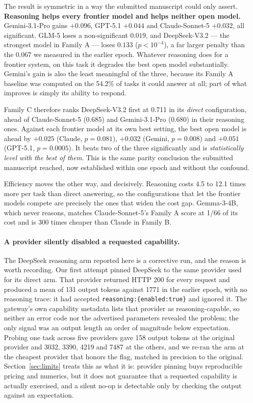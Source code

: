 \documentclass[computers,article,submit,moreauthors]{Definitions/mdpi}
\begin{document}
The result is symmetric in a way the submitted manuscript could only assert. \textbf{Reasoning helps every frontier model and helps neither open model.} Gemini-3.1-Pro gains $+0.096$, GPT-5.1 $+0.044$ and Claude-Sonnet-5 $+0.032$, all significant. GLM-5 loses a non-significant $0.019$, and DeepSeek-V3.2 --- the strongest model in Family A --- loses $0.133$ ($p<10^{-4}$), a far larger penalty than the $0.067$ we measured in the earlier epoch. Whatever reasoning does for a frontier system, on this task it degrades the best open model substantially. Gemini's gain is also the least meaningful of the three, because its Family A baseline was computed on the 54.2\% of tasks it could answer at all; part of what improves is simply its ability to respond.

Family C therefore ranks DeepSeek-V3.2 first at 0.711 in its \emph{direct} configuration, ahead of Claude-Sonnet-5 (0.685) and Gemini-3.1-Pro (0.680) in their reasoning ones. Against each frontier model at its own best setting, the best open model is ahead by $+0.025$ (Claude, $p=0.081$), $+0.032$ (Gemini, $p=0.008$) and $+0.051$ (GPT-5.1, $p=0.0005$). It beats two of the three significantly and is \emph{statistically level with the best of them}. This is the same parity conclusion the submitted manuscript reached, now established within one epoch and without the confound.

Efficiency moves the other way, and decisively. Reasoning costs 4.5 to 12.1 times more per task than direct answering, so the configurations that let the frontier models compete are precisely the ones that widen the cost gap. Gemma-3-4B, which never reasons, matches Claude-Sonnet-5's Family A score at 1/66 of its cost and is 300 times cheaper than Claude in Family B.

\paragraph{A provider silently disabled a requested capability.} The DeepSeek reasoning arm reported here is a corrective run, and the reason is worth recording. Our first attempt pinned DeepSeek to the same provider used for its direct arm. That provider returned HTTP 200 for every request and produced a mean of 131 output tokens against 1771 in the earlier epoch, with no reasoning trace: it had accepted \texttt{reasoning:\{enabled:true\}} and ignored it. The gateway's own capability metadata lists that provider as reasoning-capable, so neither an error code nor the advertised parameters revealed the problem; the only signal was an output length an order of magnitude below expectation. Probing one task across five providers gave 158 output tokens at the original provider and 3032, 3390, 4219 and 7487 at the others, and we re-ran the arm at the cheapest provider that honors the flag, matched in precision to the original. Section~\ref{sec:limits} treats this as what it is: provider pinning buys reproducible pricing and numerics, but it does not guarantee that a requested capability is actually exercised, and a silent no-op is detectable only by checking the output against an expectation.
\end{document}
